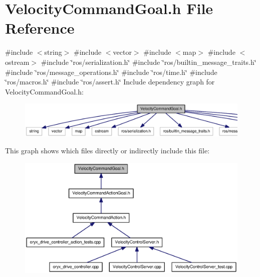 \section{\-Velocity\-Command\-Goal.\-h \-File \-Reference}
\label{VelocityCommandGoal_8h}
{\ttfamily \#include $<$string$>$}\*
{\ttfamily \#include $<$vector$>$}\*
{\ttfamily \#include $<$map$>$}\*
{\ttfamily \#include $<$ostream$>$}\*
{\ttfamily \#include \char`\"{}ros/serialization.\-h\char`\"{}}\*
{\ttfamily \#include \char`\"{}ros/builtin\-\_\-message\-\_\-traits.\-h\char`\"{}}\*
{\ttfamily \#include \char`\"{}ros/message\-\_\-operations.\-h\char`\"{}}\*
{\ttfamily \#include \char`\"{}ros/time.\-h\char`\"{}}\*
{\ttfamily \#include \char`\"{}ros/macros.\-h\char`\"{}}\*
{\ttfamily \#include \char`\"{}ros/assert.\-h\char`\"{}}\*
\-Include dependency graph for \-Velocity\-Command\-Goal.\-h\-:
\nopagebreak
\begin{figure}[H]
\begin{center}
\leavevmode
\includegraphics[width=350pt]{VelocityCommandGoal_8h__incl}
\end{center}
\end{figure}
\-This graph shows which files directly or indirectly include this file\-:
\nopagebreak
\begin{figure}[H]
\begin{center}
\leavevmode
\includegraphics[width=350pt]{VelocityCommandGoal_8h__dep__incl}
\end{center}
\end{figure}
